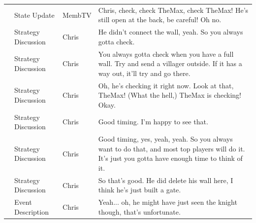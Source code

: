 {\begin{longtable}{@{}>{\theAppRow}r|L{2.3cm}L{1.0cm}U{11.55cm}@{}}
    & State Update          & MembTV       & Chris, check, check TheMax, check TheMax! He's still open at the back, be careful! Oh no.                                                                                                                                                                        \\
    & Strategy Discussion   & Chris        & He didn't connect the wall, yeah. So you always gotta check.                                                                                                                                                                                                     \\
    & Strategy Discussion   & Chris        & You always gotta check when you have a full wall. Try and send a villager outside. If it has a way out, it'll try and go there.                                                                                                                                  \\
    & Strategy Discussion   & Chris        & Oh, he's checking it right now. Look at that, TheMax! (What the hell,) TheMax is checking! Okay.                                                                                                                                                                 \\
    & Strategy Discussion   & Chris        & Good timing. I'm happy to see that.                                                                                                                                                                                                                              \\
    & Strategy Discussion   & Chris        & Good timing, yes, yeah, yeah. So you always want to do that, and most top players will do it. It's just you gotta have enough time to think of it.                                                                                                               \\
    & Strategy Discussion   & Chris        & So that's good. He did delete his wall here, I think he's just built a gate.                                                                                                                                                                                     \\
    & Event Description     & Chris        & Yeah... oh, he might have just seen the knight though, that's unfortunate.                                                                                                                                                                                       \\

\end{longtable}}
